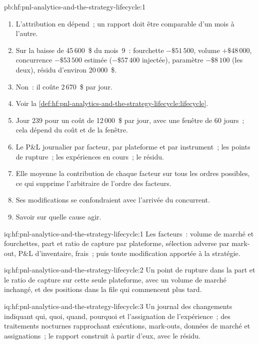 \begin{solution}{pb:hf:pnl-analytics-and-the-strategy-lifecycle:1}
\begin{enumerate}
\item L'attribution en dépend~; un rapport doit être comparable d'un mois à l'autre.
\item Sur la baisse de 45\,600~\$ du mois~9~: fourchette $-\$51\,500$, volume $+\$48\,000$, concurrence $-\$53\,500$ estimée ($-\$57\,400$ injectée), paramètre
$-\$8\,100$ (les deux), résidu d'environ 20\,000~\$.
\item Non~: il coûte 2\,670~\$ par jour.
\item Voir la \cref{def:hf:pnl-analytics-and-the-strategy-lifecycle:lifecycle}.
\item Jour 239 pour un coût de 12\,000~\$ par jour, avec une fenêtre de 60 jours~; cela dépend du coût et de la fenêtre.
\item Le P\&L journalier par facteur, par plateforme et par instrument~; les points de rupture~; les expériences en cours~; le résidu.
\item Elle moyenne la contribution de chaque facteur sur tous les ordres possibles, ce qui supprime l'arbitraire de l'ordre des facteurs.
\item Ses modifications se confondraient avec l'arrivée du concurrent.
\item Savoir sur quelle cause agir.
\end{enumerate}
\end{solution}

\begin{solution}{iq:hf:pnl-analytics-and-the-strategy-lifecycle:1}
Les facteurs~: volume de marché et fourchettes, part et ratio de capture par plateforme, sélection adverse par mark-out, P\&L d'inventaire, frais~; puis toute modification
apportée à la stratégie.
\end{solution}

\begin{solution}{iq:hf:pnl-analytics-and-the-strategy-lifecycle:2}
Un point de rupture dans la part et le ratio de capture sur cette seule plateforme, avec un volume de marché inchangé, et des positions dans la file qui commencent plus tard.
\end{solution}

\begin{solution}{iq:hf:pnl-analytics-and-the-strategy-lifecycle:3}
Un journal des changements indiquant qui, quoi, quand, pourquoi et l'assignation de l'expérience~; des traitements nocturnes rapprochant exécutions, mark-outs, données de marché et assignations~; le
rapport construit à partir d'eux, avec le résidu.
\end{solution}

